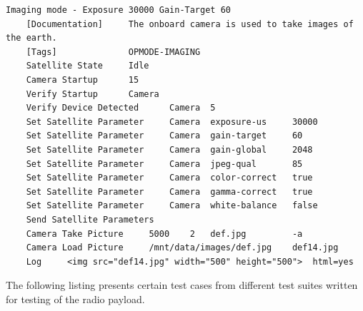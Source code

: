 \documentclass[english,12pt,a4paper,pdftex,elec,utf8]{aaltothesis}
\begin{document}
\begin{verbatim}
Imaging mode - Exposure 30000 Gain-Target 60
	[Documentation]		The onboard camera is used to take images of the earth.
	[Tags]				OPMODE-IMAGING
	Satellite State		Idle
	Camera Startup		15
	Verify Startup		Camera
	Verify Device Detected		Camera 	5
	Set Satellite Parameter		Camera	exposure-us		30000
	Set Satellite Parameter		Camera	gain-target		60
	Set Satellite Parameter		Camera	gain-global		2048
	Set Satellite Parameter		Camera	jpeg-qual		85
	Set Satellite Parameter		Camera	color-correct	true
	Set Satellite Parameter		Camera	gamma-correct	true
	Set Satellite Parameter		Camera	white-balance	false
	Send Satellite Parameters
	Camera Take Picture		5000	2	def.jpg 		-a
	Camera Load Picture		/mnt/data/images/def.jpg	def14.jpg
	Log		<img src="def14.jpg" width="500" height="500">	html=yes

\end{verbatim}
\newpage
The following listing presents certain test cases from different test suites written for testing of the radio payload.
\end{document}
